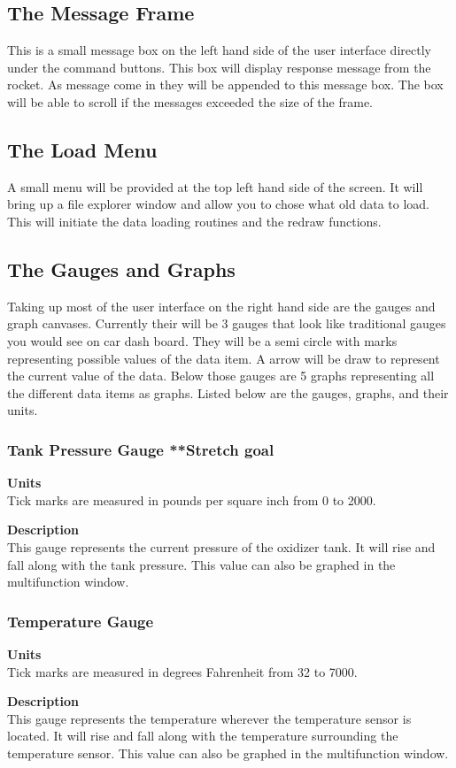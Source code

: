 \documentclass[10pt,draftclsnofoot,onecolumn,compsoc]{IEEEtran}
\begin{document}
\subsection{The Message Frame}
This is a small message box on the left hand side of the user interface directly under the command buttons. This box will display response message from the rocket. As message come in they will be appended to this message box. The box will be able to scroll if the messages exceeded the size of the frame.\par

\subsection{The Load Menu}
A small menu will be provided at the top left hand side of the screen. It will bring up a file explorer window and allow you to chose what old data to load. This will initiate the data loading routines and the redraw functions.

\subsection{The Gauges and Graphs}
Taking up most of the user interface on the right hand side are the gauges and graph canvases. Currently their will be 3 gauges that look like traditional gauges you would see on car dash board. They will be a semi circle with marks representing possible values of the data item. A arrow will be draw to represent the current value of the data. Below those gauges are 5 graphs representing all the different data items as graphs. Listed below are the gauges, graphs, and their units.

\subsubsection{Tank Pressure Gauge **Stretch goal}
{\bf Units} \\ Tick marks are measured in pounds per square inch from 0 to 2000.\par
{\bf Description} \\ This gauge represents the current pressure of the oxidizer tank. It will rise and fall along with the tank pressure. This value can also be graphed in the multifunction window.\par

\subsubsection{Temperature Gauge}
{\bf Units} \\ Tick marks are measured in degrees Fahrenheit from 32 to 7000.\par
{\bf Description} \\ This gauge represents the temperature wherever the temperature sensor is located. It will rise and fall along with the temperature surrounding the temperature sensor. This value can also be graphed in the multifunction window. \par
\end{document}
